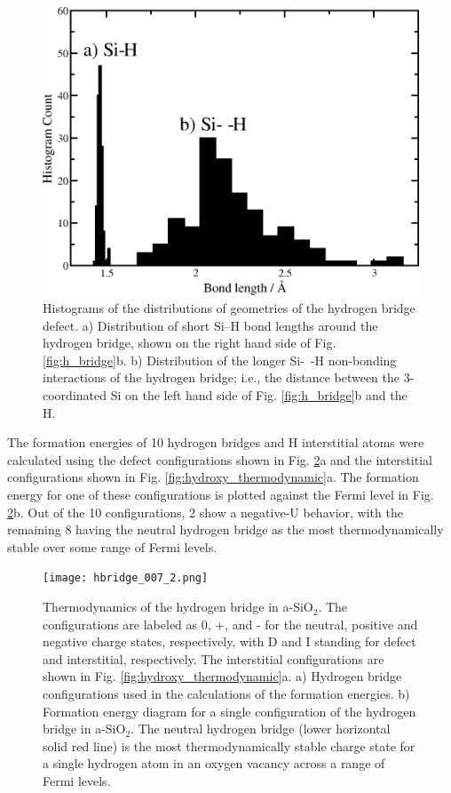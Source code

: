 \documentclass[aps,prb,reprint,superscriptaddress,showpacs]{revtex4-1}
\begin{document}
\begin{figure}
\includegraphics{hbridge_lengths_labelled.png}
\caption{Histograms of the distributions of geometries of the hydrogen bridge defect. a) Distribution of short \mbox{Si--H} bond lengths around the hydrogen bridge, shown on the right hand side of Fig. \ref{fig:h_bridge}b. b) Distribution of the longer \mbox{Si- -H} non-bonding interactions of the hydrogen bridge; i.e., the distance between the 3-coordinated Si on the left hand side of Fig. \ref{fig:h_bridge}b and the H.}
\label{fig:hbridge_dist}
\end{figure}


The formation energies of 10 hydrogen bridges and H interstitial atoms were calculated using the defect configurations shown in Fig. \ref{fig:hbridge_formation}a and the interstitial configurations shown in Fig. \ref{fig:hydroxy_thermodynamic}a. The formation energy for one of these configurations is plotted against the Fermi level in Fig. \ref{fig:hbridge_formation}b. Out of the 10 configurations, 2 show a negative-U behavior, with the remaining 8 having the neutral hydrogen bridge as the most thermodynamically stable over some range of Fermi levels. 

\begin{figure}[h!]
\texttt{[image: hbridge\_007\_2.png]}
\caption{Thermodynamics of the hydrogen bridge in a-SiO$_2$. The configurations are labeled as 0, +, and - for the neutral, positive and negative charge states, respectively, with D and I standing for defect and interstitial, respectively. The interstitial configurations are shown in Fig. \ref{fig:hydroxy_thermodynamic}a. a) Hydrogen bridge configurations used in the calculations of the formation energies. b) Formation energy diagram for a single configuration of the hydrogen bridge in a-SiO$_2$. The neutral hydrogen bridge (lower horizontal solid red line) is the most thermodynamically stable charge state for a single hydrogen atom in an oxygen vacancy across a range of Fermi levels.}
\label{fig:hbridge_formation}
\end{figure}
\end{document}
